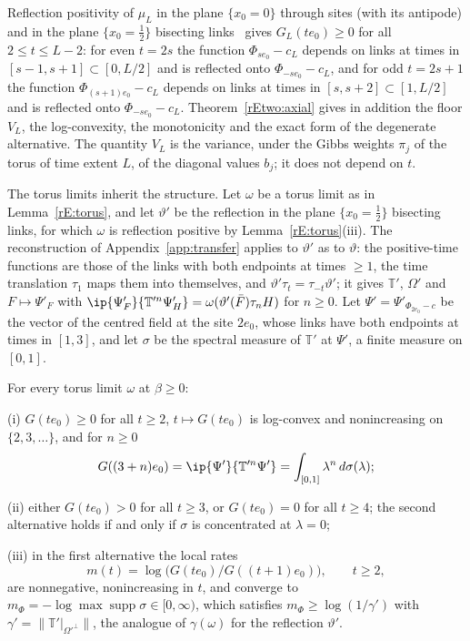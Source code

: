 \begin{remark}\label{rEtwo:axialremark}
Reflection positivity of $\mu_L$ in the plane $\{x_0=0\}$ through sites
(with its antipode) and in the plane $\{x_0=\frac12\}$ bisecting
links~\cite{OSei78} gives $G_L(te_0)\ge0$ for all $2\le t\le L-2$: for even
$t=2s$ the function $\Phi_{se_0}-c_L$ depends on links at times in
$[s-1,s+1]\subset[0,L/2]$ and is reflected onto $\Phi_{-se_0}-c_L$, and for
odd $t=2s+1$ the function $\Phi_{(s+1)e_0}-c_L$ depends on links at times
in $[s,s+2]\subset[1,L/2]$ and is reflected onto $\Phi_{-se_0}-c_L$.
Theorem~\ref{rEtwo:axial} gives in addition the floor $V_L$, the
log-convexity, the monotonicity and the exact form of the degenerate
alternative. The quantity $V_L$ is the variance, under the Gibbs weights
$\pi_j$ of the torus of time extent $L$, of the diagonal values $b_j$; it
does not depend on $t$.
\end{remark}

The torus limits inherit the structure. Let $\omega$ be a torus limit as
in Lemma~\ref{rE:torus}, and let $\vartheta'$ be the reflection in the
plane $\{x_0=\tfrac12\}$ bisecting links, for which $\omega$ is reflection
positive by Lemma~\ref{rE:torus}(iii). The reconstruction of
Appendix~\ref{app:transfer} applies to $\vartheta'$ as to $\vartheta$: the
positive-time functions are those of the links with both endpoints at
times $\ge1$, the time translation $\tau_1$ maps them into themselves, and
$\vartheta'\tau_t=\tau_{-t}\vartheta'$; it gives $\mathbb T'$, $\Omega'$ and
$F\mapsto\Psi'_F$ with $\ip{\Psi'_F}{\mathbb T'^n\Psi'_H}=\omega(\vartheta'
(\bar F)\tau_nH)$ for $n\ge0$. Let $\Psi'=\Psi'_{\Phi_{2e_0}-c}$ be the
vector of the centred field at the site $2e_0$, whose links have both
endpoints at times in $[1,3]$, and let $\sigma$ be the spectral measure of
$\mathbb T'$ at $\Psi'$, a finite measure on $[0,1]$.

\begin{corollary}\label{rEtwo:limit}
For every torus limit $\omega$ at $\beta\ge0$:

\textup{(i)} $G(te_0)\ge0$ for all $t\ge2$, $t\mapsto G(te_0)$ is
log-convex and nonincreasing on $\{2,3,\dots\}$, and for $n\ge0$
\[
G((3+n)e_0)=\ip{\Psi'}{\mathbb T'^n\Psi'}=\int_{[0,1]}\lambda^n\,d\sigma(\lambda);
\]

\textup{(ii)} either $G(te_0)>0$ for all $t\ge3$, or $G(te_0)=0$ for all
$t\ge4$; the second alternative holds if and only if $\sigma$ is
concentrated at $\lambda=0$;

\textup{(iii)} in the first alternative the local rates
\[
m(t)=\log\bigl(G(te_0)/G((t+1)e_0)\bigr),\qquad t\ge2,
\]
are nonnegative, nonincreasing in $t$, and converge to
$m_\Phi=-\log\max\operatorname{supp}\sigma\in[0,\infty)$, which satisfies
$m_\Phi\ge\log(1/\gamma')$ with $\gamma'=\|\mathbb T'|_{\Omega'^\perp}\|$,
the analogue of $\gamma(\omega)$ for the reflection $\vartheta'$.
\end{corollary}

